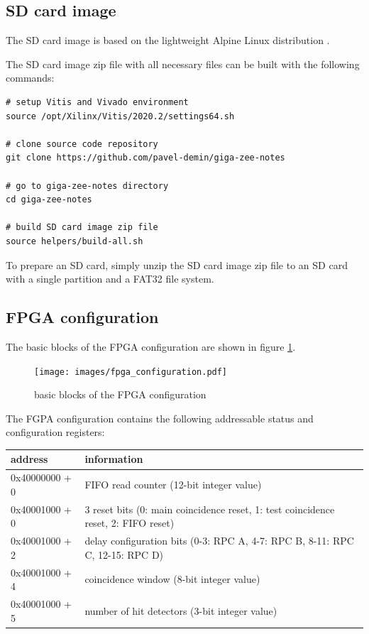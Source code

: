 \documentclass[12pt, a4paper]{article}
\begin{document}
\subsection{SD card image}

The SD card image is based on the lightweight Alpine Linux distribution \cite{alpine}.

The SD card image zip file with all necessary files can be built with the following commands:
\vspace{-1ex}
\begin{verbatim}
# setup Vitis and Vivado environment
source /opt/Xilinx/Vitis/2020.2/settings64.sh

# clone source code repository
git clone https://github.com/pavel-demin/giga-zee-notes

# go to giga-zee-notes directory
cd giga-zee-notes

# build SD card image zip file
source helpers/build-all.sh
\end{verbatim}

To prepare an SD card, simply unzip the SD card image zip file to an SD card with a single partition and a FAT32 file system.

\subsection{FPGA configuration}

The basic blocks of the FPGA configuration are shown in figure \ref{fig:fpga_configuration}.

\begin{figure}[h!]
  \centering
  \texttt{[image: images/fpga\_configuration.pdf]}
  \caption{basic blocks of the FPGA configuration}
  \label{fig:fpga_configuration}
\end{figure}

The FGPA configuration contains the following addressable status and configuration registers:
\begin{center}
  \begin{tabular}{|l|l|}
  \hline
  \textbf{address} & \textbf{information} \\
  \hline
  0x40000000 + 0 & FIFO read counter (12-bit integer value) \\
  \hline
  0x40001000 + 0 & 3 reset bits (0: main coincidence reset, 1: test coincidence reset, 2: FIFO reset) \\
  \hline
  0x40001000 + 2 & delay configuration bits (0-3: RPC A, 4-7: RPC B, 8-11: RPC C, 12-15: RPC D) \\
  \hline
  0x40001000 + 4 & coincidence window (8-bit integer value) \\
  \hline
  0x40001000 + 5 & number of hit detectors (3-bit integer value) \\
  \hline
  \end{tabular}
\end{center}
\end{document}
